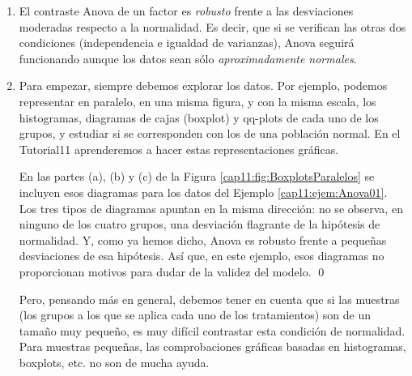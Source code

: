 \begin{enumerate}
    \item El contraste Anova de un factor es {\em robusto} frente a las desviaciones moderadas
        respecto a la normalidad. Es decir, que si se verifican las otras dos condiciones
        (independencia e igualdad de varianzas), Anova seguirá funcionando aunque los datos sean
        sólo {\em aproximadamente normales}.

    \item Para empezar, siempre debemos explorar los datos. Por ejemplo, podemos representar en         paralelo, en una misma figura, y con la misma escala, los histogramas,  diagramas de         cajas (boxplot) y qq-plots de cada uno de los grupos, y estudiar si se corresponden con los de una población normal.  En el Tutorial11 aprenderemos a hacer estas representaciones gráficas.
        \begin{ejemplo}
        En las partes (a), (b) y (c) de la Figura \ref{cap11:fig:BoxplotsParalelos}  se incluyen esos diagramas para los datos del Ejemplo \ref{cap11:ejem:Anova01}.  Los tres tipos de diagramas apuntan en la misma dirección: no se observa, en ninguno de los cuatro grupos, una desviación flagrante de la hipótesis de normalidad. Y, como ya hemos dicho, Anova es robusto frente a pequeñas desviaciones de esa hipótesis. Así que, en este ejemplo, esos diagramas no proporcionan  motivos para dudar de la validez del modelo.
        \qed
        \end{ejemplo}
        Pero, pensando más en general, debemos tener en cuenta que si las muestras (los grupos a los que se aplica cada uno de los tratamientos) son de un tamaño muy pequeño, es muy difícil contrastar esta condición de normalidad. Para muestras pequeñas, las comprobaciones gráficas basadas en histogramas, boxplots, etc. no son de mucha ayuda.

\end{enumerate}

